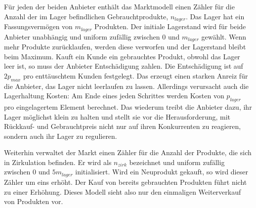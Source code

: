 Für jeden der beiden Anbieter enthält das Marktmodell einen Zähler für die Anzahl der im Lager befindlichen Gebrauchtprodukte, $n_{lager}$.
Das Lager hat ein Fassungsvermögen von $m_{lager}$ Produkten.
Der initiale Lagerstand wird für beide Anbieter unabhängig und uniform zufällig zwischen $0$ und $m_{lager}$ gewählt.
Wenn mehr Produkte zurücklaufen, werden diese verworfen und der Lagerstand bleibt beim Maximum.
Kauft ein Kunde ein gebrauchtes Produkt, obwohl das Lager leer ist, so muss der Anbieter Entschädigung zahlen.
Die Entschädigung ist auf $2 p_{max}$ pro enttäuschtem Kunden festgelegt.
Das erzeugt einen starken Anreiz für die Anbieter, das Lager nicht leerlaufen zu lassen.
Allerdings verursacht auch die Lagerhaltung Kosten: Am Ende eines jeden Schrittes werden Kosten von $p_{lager}$ pro eingelagertem Element berechnet.
Das wiederum treibt die Anbieter dazu, ihr Lager möglichst klein zu halten und stellt sie vor die Herausforderung, mit Rückkauf- und Gebrauchtpreis nicht nur auf ihren Konkurrenten zu reagieren, sondern auch ihr Lager zu regulieren.

Weiterhin verwaltet der Markt einen Zähler für die Anzahl der Produkte, die sich in Zirkulation befinden.
Er wird als $n_{zirk}$ bezeichnet und uniform zufällig zwischen $0$ und $5 m_{lager}$ initialisiert.
Wird ein Neuprodukt gekauft, so wird dieser Zähler um eins erhöht.
Der Kauf von bereits gebrauchten Produkten führt nicht zu einer Erhöhung.
Dieses Modell sieht also nur den einmaligen Weiterverkauf von Produkten vor.


